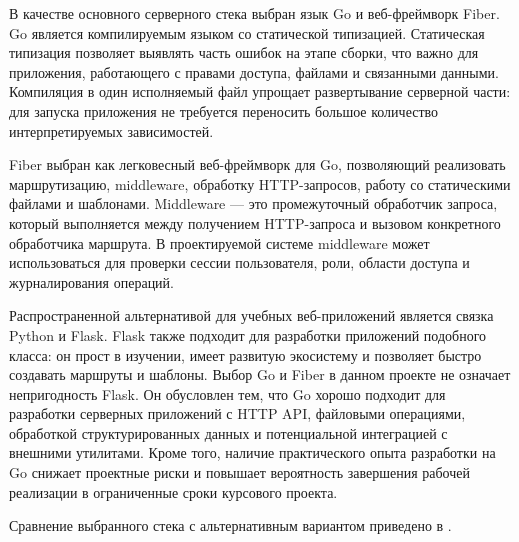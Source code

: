 В качестве основного серверного стека выбран язык Go и веб-фреймворк Fiber. Go
является компилируемым языком со статической типизацией. Статическая типизация
позволяет выявлять часть ошибок на этапе сборки, что важно для приложения,
работающего с правами доступа, файлами и связанными данными. Компиляция в один
исполняемый файл упрощает развертывание серверной части: для запуска приложения
не требуется переносить большое количество интерпретируемых зависимостей.

Fiber выбран как легковесный веб-фреймворк для Go, позволяющий реализовать
маршрутизацию, middleware, обработку HTTP-запросов, работу со статическими
файлами и шаблонами. Middleware --- это промежуточный обработчик запроса,
который выполняется между получением HTTP-запроса и вызовом конкретного
обработчика маршрута. В проектируемой системе middleware может использоваться
для проверки сессии пользователя, роли, области доступа и журналирования
операций.

Распространенной альтернативой для учебных веб-приложений является связка
Python и Flask. Flask также подходит для разработки приложений подобного класса:
он прост в изучении, имеет развитую экосистему и позволяет быстро создавать
маршруты и шаблоны. Выбор Go и Fiber в данном проекте не означает непригодность
Flask. Он обусловлен тем, что Go хорошо подходит для разработки серверных
приложений с HTTP API, файловыми операциями, обработкой структурированных
данных и потенциальной интеграцией с внешними утилитами. Кроме того, наличие
практического опыта разработки на Go снижает проектные риски и повышает
вероятность завершения рабочей реализации в ограниченные сроки курсового
проекта.

Сравнение выбранного стека с альтернативным вариантом приведено в
.

